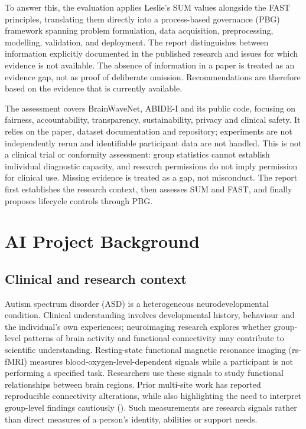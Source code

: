 \documentclass[11pt,a4paper]{article}
\begin{document}
To answer this, the evaluation applies Leslie's SUM values alongside the FAST principles, translating them directly into a process-based governance (PBG) framework spanning problem formulation, data acquisition, preprocessing, modelling, validation, and deployment. The report distinguishes between information explicitly documented in the published research and issues for which evidence is not available. The absence of information in a paper is treated as an evidence gap, not as proof of deliberate omission. Recommendations are therefore based on the evidence that is currently available.

The assessment covers BrainWaveNet, ABIDE-I and its public code, focusing on fairness, accountability, transparency, sustainability, privacy and clinical safety. It relies on the paper, dataset documentation and repository; experiments are not independently rerun and identifiable participant data are not handled. This is not a clinical trial or conformity assessment: group statistics cannot establish individual diagnostic capacity, and research permissions do not imply permission for clinical use. Missing evidence is treated as a gap, not misconduct. The report first establishes the research context, then assesses SUM and FAST, and finally proposes lifecycle controls through PBG.

\section{AI Project Background}
\subsection{Clinical and research context}
Autism spectrum disorder (ASD) is a heterogeneous neurodevelopmental condition. Clinical understanding involves developmental history, behaviour and the individual's own experiences; neuroimaging research explores whether group-level patterns of brain activity and functional connectivity may contribute to scientific understanding. Resting-state functional magnetic resonance imaging (rs-fMRI) measures blood-oxygen-level-dependent signals while a participant is not performing a specified task. Researchers use these signals to study functional relationships between brain regions. Prior multi-site work has reported reproducible connectivity alterations, while also highlighting the need to interpret group-level findings cautiously (\cite{holiga2019}). Such measurements are research signals rather than direct measures of a person's identity, abilities or support needs.
\end{document}
